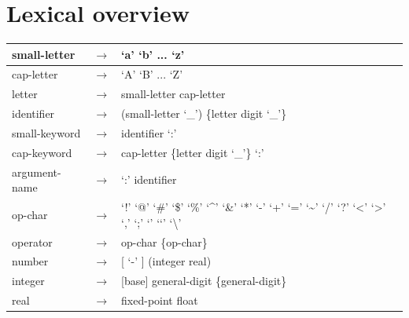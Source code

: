 \documentclass[letterpaper,10pt,english]{sphinxmanual}
\begin{document}
\section{Lexical overview}
\label{lexicaloverview:lexical-overview}\label{lexicaloverview::doc}
\begin{tabulary}{\linewidth}{|L|L|L|}
\hline

small-letter
 & 
\(\rightarrow\)
 & 
‘a’ \textbar{} ‘b’ \textbar{} ... \textbar{} ‘z’
\\\hline

cap-letter
 & 
\(\rightarrow\)
 & 
‘A’ \textbar{} ‘B’ \textbar{} ... \textbar{} ‘Z’
\\\hline

letter
 & 
\(\rightarrow\)
 & 
small-letter \textbar{} cap-letter
\\\hline

identifier
 & 
\(\rightarrow\)
 & 
(small-letter \textbar{} ‘\_’) \{letter \textbar{} digit \textbar{} ‘\_’\}
\\\hline

small-keyword
 & 
\(\rightarrow\)
 & 
identifier ‘:’
\\\hline

cap-keyword
 & 
\(\rightarrow\)
 & 
cap-letter \{letter \textbar{} digit \textbar{} ‘\_’\} ‘:’
\\\hline

argument-name
 & 
\(\rightarrow\)
 & 
‘:’ identifier
\\\hline

op-char
 & 
\(\rightarrow\)
 & 
‘!’ \textbar{} ‘@’ \textbar{} ‘\#’ \textbar{} ‘\$’ \textbar{} ‘\%’ \textbar{} ‘\textasciicircum{}’ \textbar{} ‘\&’ \textbar{} ‘*’ \textbar{} ‘-’ \textbar{} ‘+’ \textbar{} ‘=’ \textbar{} ‘\textasciitilde{}’ \textbar{} ‘/’ \textbar{} ‘?’ \textbar{} ‘\textless{}’ \textbar{} ‘\textgreater{}’ \textbar{} ‘,’ \textbar{} ‘;’ \textbar{} ‘\textbar{}’ \textbar{} ‘‘’ \textbar{} ‘\textbackslash{}’
\\\hline

operator
 & 
\(\rightarrow\)
 & 
op-char \{op-char\}
\\\hline

number
 & 
\(\rightarrow\)
 & 
{[} ‘-’ {]} (integer \textbar{} real)
\\\hline

integer
 & 
\(\rightarrow\)
 & 
{[}base{]} general-digit \{general-digit\}
\\\hline

real
 & 
\(\rightarrow\)
 & 
fixed-point \textbar{} float
\\\hline


\end{tabulary}
\end{document}
